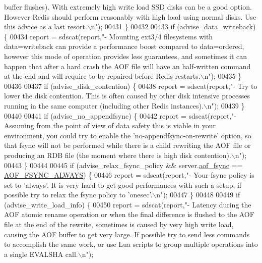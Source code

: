 \begin{DoxyCode}
{{{{       buffer flushes). With extremely high write load SSD disks can be a good option. However Redis should perform
       reasonably with high load using normal disks. Use this advice as a last resort.\(\backslash\)n"});
00431         \}
00432 
00433         \textcolor{keywordflow}{if} (advise\_data\_writeback) \{
00434             report = sdscat(report,\textcolor{stringliteral}{"- Mounting ext3/4 filesystems with data=writeback can provide a
       performance boost compared to data=ordered, however this mode of operation provides less guarantees, and
       sometimes it can happen that after a hard crash the AOF file will have an half-written command at the end and
       will require to be repaired before Redis restarts.\(\backslash\)n"});
00435         \}
00436 
00437         \textcolor{keywordflow}{if} (advise\_disk\_contention) \{
00438             report = sdscat(report,\textcolor{stringliteral}{"- Try to lower the disk contention. This is often caused by other
       disk intensive processes running in the same computer (including other Redis instances).\(\backslash\)n"});
00439         \}
00440 
00441         \textcolor{keywordflow}{if} (advise\_no\_appendfsync) \{
00442             report = sdscat(report,\textcolor{stringliteral}{"- Assuming from the point of view of data safety this is viable in
       your environment, you could try to enable the 'no-appendfsync-on-rewrite' option, so that fsync will not be
       performed while there is a child rewriting the AOF file or producing an RDB file (the moment where there is
       high disk contention).\(\backslash\)n"});
00443         \}
00444 
00445         \textcolor{keywordflow}{if} (advise\_relax\_fsync\_policy && server.\hyperlink{config_8h_af5994c643c434574580bb7816af82cad}{aof\_fsync} == 
      \hyperlink{server_8h_a83bfec10b7b4be60ec6d5868cadc73bb}{AOF\_FSYNC\_ALWAYS}) \{
00446             report = sdscat(report,\textcolor{stringliteral}{"- Your fsync policy is set to 'always'. It is very hard to get
       good performances with such a setup, if possible try to relax the fsync policy to 'onesec'.\(\backslash\)n"});
00447         \}
00448 
00449         \textcolor{keywordflow}{if} (advise\_write\_load\_info) \{
00450             report = sdscat(report,\textcolor{stringliteral}{"- Latency during the AOF atomic rename operation or when the final
       difference is flushed to the AOF file at the end of the rewrite, sometimes is caused by very high write
       load, causing the AOF buffer to get very large. If possible try to send less commands to accomplish the same
       work, or use Lua scripts to group multiple operations into a single EVALSHA call.\(\backslash\)n"});
}}}
\end{DoxyCode}
